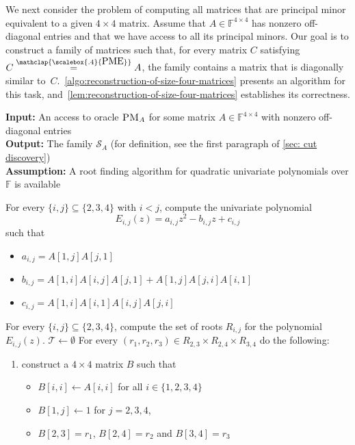 \documentclass[11pt,letterpaper]{article}
\newcommand{\F}{\mathbb{F}}
\newcommand{\PME}{\stackrel{\mathclap{\scalebox{.4}{\mbox{PME}}}}{=}}
\newcommand{\PMoracle}[1]{\textsc{PM}_{#1}}
\newcommand{\fourPMEfamily}[1]{\mathcal{S}_{#1}}
\begin{document}
{{{We next consider the problem of computing all matrices that are principal minor equivalent to a given $4\times4$ matrix.
Assume that $A\in\F^{4\times4}$ has nonzero off-diagonal entries and that we have access to all its principal minors. Our goal is to construct a family of matrices such that, for every matrix $C$ satisfying $C\PME A$, the family contains a matrix that is diagonally similar to~$C$.~\cref{algo:reconstruction-of-size-four-matrices} presents an algorithm for this task, and~\cref{lem:reconstruction-of-size-four-matrices} establishes its correctness. 
\begin{algorithm}[H]
\caption{Reconstruction of $4\times 4$ principal minor equivalent matrices}
\label{algo:reconstruction-of-size-four-matrices}
\textbf{Input:} An access to oracle $\PMoracle{A}$ for some matrix $A\in\F^{4\times 4}$ with nonzero off-diagonal entries\\
\textbf{Output:} The family $\fourPMEfamily{A}$ (for definition, see the first paragraph of \cref{sec: cut discovery})\\
\textbf{Assumption:} A root finding algorithm for quadratic univariate polynomials over $\F$ is available
\begin{algorithmic}[1]
\State For every $\{i,j\}\subseteq \{2,3,4\}$ with $i<j$, compute the univariate polynomial
\begin{equation}
\label{eqn:reconstruction-of-size-four-matrices-equation}
E_{i,j}(z)= a_{i,j}z^2-b_{i,j}z+c_{i,j}
\end{equation}
such that \begin{itemize}
\item $a_{i,j}=A[1,j]A[j,1]$
\item $b_{i,j}=A[1,i]A[i,j]A[j,1]+A[1, j]A[j, i]A[i,1]$
\item $c_{i,j}=A[1,i]A[i,1]A[i,j]A[j,i]$
\end{itemize}
\State For every $\{i,j\}\subseteq \{2,3,4\}$, compute the set of roots $R_{i,j}$ for the polynomial $E_{i, j}(z)$.
\State $\mathcal T\leftarrow \emptyset$
\State For every $(r_1, r_2, r_3)\in R_{2,3}\times R_{2, 4}\times R_{3,4}$ do the following:
\begin{enumerate}[label=\roman*)]
\item construct a $4\times 4$ matrix $B$ such that
\begin{itemize}
 \item $B[i,i]\leftarrow A[i,i]$ for all $i\in\{1,2,3,4\}$  
 \item $B[1, j]\leftarrow 1$ for $j=2,3,4$,
 \item $B[2,3]=r_1$, $B[2,4]=r_2$ and $B[3,4]=r_3$

\end{itemize}
\end{enumerate}
\end{algorithmic}
\end{algorithm}}}}
\end{document}
